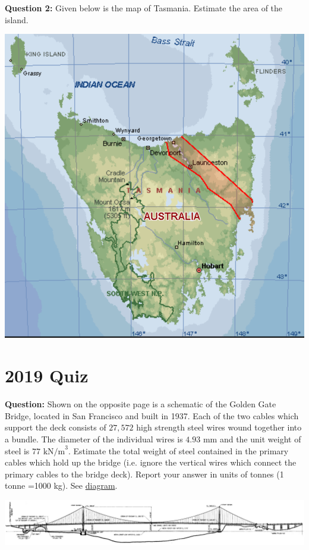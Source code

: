 \documentclass{article}
\begin{document}
\newpage
\textbf{Question 2:} Given below is the map of Tasmania. Estimate the area of the island.
\begin{center}
    \includegraphics[width=0.8\linewidth]{2011-3-2.png}
\end{center}

\newpage
\section*{2019 Quiz}
\textbf{Question:} Shown on the opposite page is a schematic of the Golden Gate Bridge, located in San Francisco and built in 1937. Each of the two cables which support the deck consists of $27,572$ high strength steel wires wound together into a bundle. The diameter of the individual wires is $4.93 \text{ mm}$ and the unit weight of steel is $77 \text{ kN/m}^3$. Estimate the total weight of steel contained in the primary cables which hold up the bridge (i.e. ignore the vertical wires which connect the primary cables to the bridge deck). Report your answer in units of tonnes (1 tonne =1000 kg). See \href{https://www.goldengate.org/assets/1/6/ggb_plan_elevation_drawing.jpg}{diagram}.
\begin{center}
    \includegraphics[width=\linewidth]{2018-1-1.jpg}
\end{center}
\end{document}
